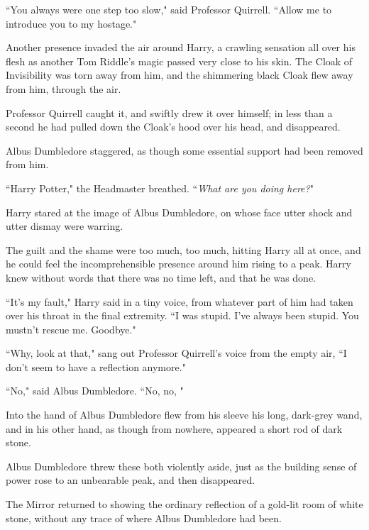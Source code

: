 ``You always were one step too slow," said Professor Quirrell. ``Allow me to introduce you to my hostage."

Another presence invaded the air around Harry, a crawling sensation all over his flesh as another Tom Riddle's magic passed very close to his skin. The Cloak of Invisibility was torn away from him, and the shimmering black Cloak flew away from him, through the air.

Professor Quirrell caught it, and swiftly drew it over himself; in less than a second he had pulled down the Cloak's hood over his head, and disappeared.

Albus Dumbledore staggered, as though some essential support had been removed from him.

``Harry Potter," the Headmaster breathed. ``\emph{What are you doing here?}"

Harry stared at the image of Albus Dumbledore, on whose face utter shock and utter dismay were warring.

The guilt and the shame were too much, too much, hitting Harry all at once, and he could feel the incomprehensible presence around him rising to a peak. Harry knew without words that there was no time left, and that he was done.

``It's my fault," Harry said in a tiny voice, from whatever part of him had taken over his throat in the final extremity. ``I was stupid. I've always been stupid. You mustn't rescue me. Goodbye."

``Why, look at that," sang out Professor Quirrell's voice from the empty air, ``I don't seem to have a reflection anymore."

``No," said Albus Dumbledore. ``No, no, "

Into the hand of Albus Dumbledore flew from his sleeve his long, dark-grey wand, and in his other hand, as though from nowhere, appeared a short rod of dark stone.

Albus Dumbledore threw these both violently aside, just as the building sense of power rose to an unbearable peak, and then disappeared.

The Mirror returned to showing the ordinary reflection of a gold-lit room of white stone, without any trace of where Albus Dumbledore had been.

